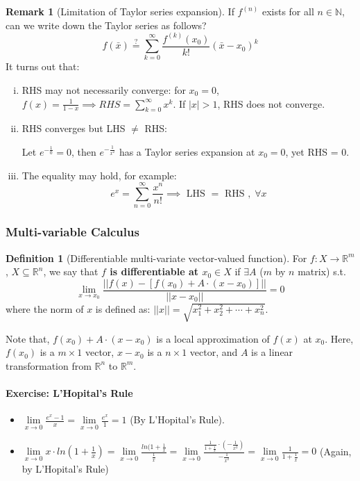 \documentclass[12pt]{article}
\newcommand{\N}{{\mathbb N}}
\newcommand{\R}{{\mathbb R}}
\theoremstyle{definition}
\newtheorem{definition}[theorem]{Definition}
\newtheorem{remark}[theorem]{Remark}
\theoremstyle{plain}
\begin{document}
\setcounter{theorem}{3}

\begin{remark}
    [Limitation of Taylor series expansion]
    If $f^{(n)}$ exists for all $n \in \N$, can we write down the Taylor series
    as follows?
    \[
        f(\bar x) \stackrel{?}{=} \sum_{k=0}^\infty \frac{f^{(k)}(x_0)}{k!} (\bar x - x_0)^k
    \]
    It turns out that:
    \begin{enumerate}[(i)]
        \item RHS may not necessarily converge: for $x_0 = 0$, $f(x) =
            \frac{1}{1-x} \implies RHS = \sum_{k=0}^\infty x^k$. If $|x| > 1$,
            RHS does not converge.
        \item RHS converges but LHS $\not=$ RHS:

            Let $e^{-\frac{1}{0}} = 0$, then $e^{-\frac{1}{x^2}}$ has a Taylor
            series expansion at $x_0 = 0$, yet RHS = 0.
        \item The equality may hold, for example:
            \[
                e^x = \sum_{n=0}^\infty \frac{x^n}{n!} \implies \text{ LHS } =
                \text{ RHS }, \; \forall x
            \]
    \end{enumerate}
\end{remark}

\subsubsection{Multi-variable Calculus}
\begin{definition}
    [Differentiable multi-variate vector-valued function]
    \label{sec:multi_variable_matrix_A_as_gradient}
    For $f: X\to \R^m$, $X \subseteq \R^n$, we say that \textbf{$f$ is
    differentiable at $x_0 \in X$} if $\exists A$ ($m$ by $n$ matrix) s.t.
    \[
        \lim_{x \to x_0}
        \frac{||f(x) - [f(x_0) + A \cdot (x - x_0)]||}
        {||x -
        x_0||} = 0
    \]
    where the norm of $x$ is defined as: $||x|| = \sqrt{x_1^2 + x_2^2 + \cdots +
    x_n^2}$.
\end{definition}
Note that, $f(x_0) + A \cdot (x - x_0)$ is a local approximation of $f(x)$ at
$x_0$. Here, $f(x_0)$ is a $m \times 1$ vector, $x - x_0$ is a $n\times 1$
vector, and $A$ is a linear transformation from $\R^n$ to $\R^m$.

\paragraph{Exercise: L'Hopital's Rule}
\begin{itemize}
    \item $\underset{x \to 0} \lim  \frac{e^x- 1}{x} = \underset{x \to 0}
        \lim \frac{e^x}{1} = 1$ (By L'Hopital's Rule).
    \item $\underset{x \to 0} \lim x \cdot ln ( 1 + \frac{1}{x}) =
        \underset{x \to 0}\lim \frac{ln(1 + \frac{1}{x}}{\frac{1}{x}} =
            \underset{x \to 0} \lim \frac{\frac{1}{1+\frac{1}{x}} \cdot \left(
            -\frac{1}{x^2} \right)}{-\frac{1}{x^2}} = \underset{x \to 0}\lim
            \frac{1}{1 + \frac{1}{x}} = 0$ (Again, by L'Hopital's Rule)
\end{itemize}
\end{document}
